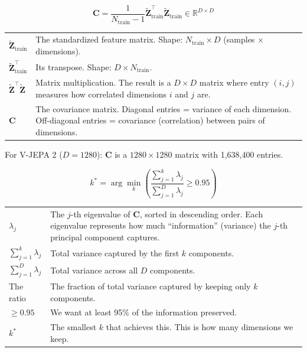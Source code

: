 \documentclass[12pt, a4paper]{article}
\begin{document}
\begin{eqbox}
\[
\mathbf{C} = \frac{1}{N_{\text{train}}-1} \tilde{\mathbf{Z}}_{\text{train}}^\top \tilde{\mathbf{Z}}_{\text{train}} \in \mathbb{R}^{D \times D}
\]
\end{eqbox}

\begin{explainbox}
\begin{tabular}{lp{11cm}}
$\tilde{\mathbf{Z}}_{\text{train}}$ & The standardized feature matrix. Shape: $N_{\text{train}} \times D$ (samples $\times$ dimensions).\\[0.2cm]
$\tilde{\mathbf{Z}}_{\text{train}}^\top$ & Its transpose. Shape: $D \times N_{\text{train}}$.\\[0.2cm]
$\tilde{\mathbf{Z}}^\top \tilde{\mathbf{Z}}$ & Matrix multiplication. The result is a $D \times D$ matrix where entry $(i,j)$ measures how correlated dimensions $i$ and $j$ are.\\[0.2cm]
$\mathbf{C}$ & The covariance matrix. Diagonal entries = variance of each dimension. Off-diagonal entries = covariance (correlation) between pairs of dimensions.
\end{tabular}

For V-JEPA 2 ($D = 1280$): $\mathbf{C}$ is a $1280 \times 1280$ matrix with 1,638,400 entries.
\end{explainbox}

\begin{eqbox}
\[
k^* = \arg\min_{k} \left( \frac{\sum_{j=1}^{k} \lambda_j}{\sum_{j=1}^{D} \lambda_j} \ge 0.95 \right)
\]
\end{eqbox}

\begin{explainbox}
\begin{tabular}{lp{11cm}}
$\lambda_j$ & The $j$-th eigenvalue of $\mathbf{C}$, sorted in descending order. Each eigenvalue represents how much ``information'' (variance) the $j$-th principal component captures.\\[0.2cm]
$\sum_{j=1}^{k} \lambda_j$ & Total variance captured by the first $k$ components.\\[0.2cm]
$\sum_{j=1}^{D} \lambda_j$ & Total variance across all $D$ components.\\[0.2cm]
The ratio & The fraction of total variance captured by keeping only $k$ components.\\[0.2cm]
$\ge 0.95$ & We want at least 95\% of the information preserved.\\[0.2cm]
$k^*$ & The smallest $k$ that achieves this. This is how many dimensions we keep.
\end{tabular}
\end{explainbox}
\end{document}
